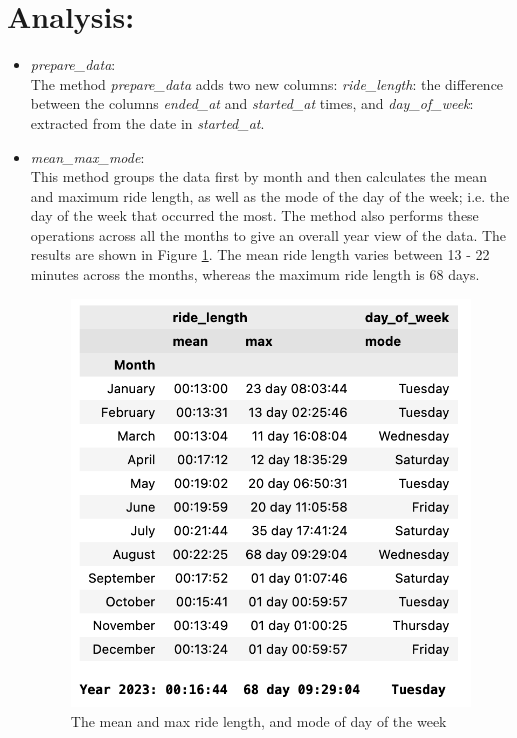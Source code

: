 \documentclass[12pt]{article}
\begin{document}
\section*{Analysis:}
\begin{itemize}
\item \textit{prepare\_data}:\\
	The method \textit{prepare\_data} adds two new columns: \textit{ride\_length}: the difference between the columns \textit{ended\_at} and \textit{started\_at} times, and \textit{day\_of\_week}: extracted from the date in \textit{started\_at}. 
	
\item \textit{mean\_max\_mode}:\\	
	This method groups the data first by month and then calculates the mean and maximum ride length, as well as the mode of the day of the week; i.e. the day of the week that occurred the most. The method also performs these operations across all the months to give an overall year view of the data. The results are shown in Figure \ref{fig9}. The mean ride length varies between 13 - 22 minutes across the months, whereas the maximum ride length is 68 days. 
	
	\begin{figure}[h]
	\centering
	\includegraphics[scale=0.7]{imgMeanMax1.png} 
	\caption{The mean and max ride length, and mode of day of the week}
	\label{fig9}
	\end{figure}
	

\end{itemize}
\end{document}
